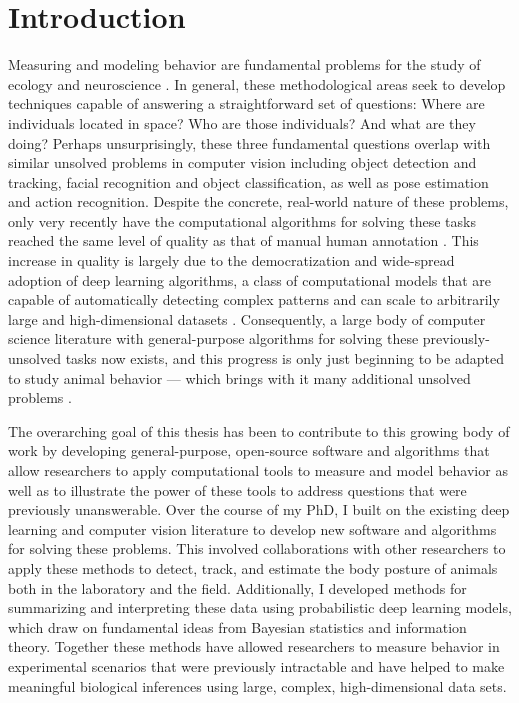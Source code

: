 	\chapter*{Introduction}
Measuring and modeling behavior are fundamental problems for the study of ecology and neuroscience \citep{berman2018measuring, brown2018ethology}. In general, these methodological areas seek to develop techniques capable of answering a straightforward set of questions: Where are individuals located in space? Who are those individuals? And what are they doing? Perhaps unsurprisingly, these three fundamental questions overlap with similar unsolved problems in computer vision \citep{dell2014automated, lecun2015deep} including object detection and tracking, facial recognition and object classification, as well as pose estimation and action recognition. Despite the concrete, real-world nature of these problems, only very recently have the computational algorithms for solving these tasks reached the same level of quality as that of manual human annotation \citep{lecun2015deep, goodfellow2016deep}. This increase in quality is largely due to the democratization and wide-spread adoption of deep learning algorithms, a class of computational models that are capable of automatically detecting complex patterns and can scale to arbitrarily large and high-dimensional datasets \citep{lecun2015deep, goodfellow2016deep}. Consequently, a large body of computer science literature with general-purpose algorithms for solving these previously-unsolved tasks now exists, and this progress is only just beginning to be adapted to study animal behavior \citep{mathis2018deeplabcut, pereira2019fast, graving2019deepposekit, gunel2019deepfly3d} --- which brings with it many additional unsolved problems \citep{graving2019deepposekit, mathis2020deep, mathis2020primer}.

The overarching goal of this thesis has been to contribute to this growing body of work by developing general-purpose, open-source software and algorithms that allow researchers to apply computational tools to measure and model behavior as well as to illustrate the power of these tools to address questions that were previously unanswerable. Over the course of my PhD, I built on the existing deep learning and computer vision literature to develop new software and algorithms for solving these problems. This involved collaborations with other researchers to apply these methods to detect, track, and estimate the body posture of animals both in the laboratory and the field. Additionally, I developed methods for summarizing and interpreting these data using probabilistic deep learning models, which draw on fundamental ideas from Bayesian statistics and information theory. Together these methods have allowed researchers to measure behavior in experimental scenarios that were previously intractable and have helped to make meaningful biological inferences using large, complex, high-dimensional data sets.


